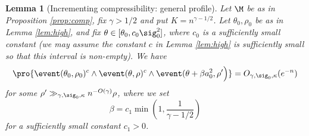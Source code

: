\documentclass[aop,preprint]{imsart}
\theoremstyle{plain}
\newtheorem{lemma}[theorem]{Lemma}
\theoremstyle{definition}
\theoremstyle{remark}
\numberwithin{equation}{section}
\numberwithin{theorem}{section}
\begin{document}
\begin{lemma}[Incrementing compressibility: general profile]	\label{lem:increment_gen}
Let $\M$ be as in Proposition \ref{prop:comp}, fix $\gamma>1/2$ and put $K=n^{\gamma-1/2}$. Let $\theta_0,\rho_0$ be as in Lemma \ref{lem:high}, and fix $\theta\in [\theta_0,c_0\sig_0^2]$, where $c_0$ is a sufficiently small constant (we may assume the constant $c$ in Lemma \ref{lem:high} is sufficiently small so that this interval is non-empty).
We have
\begin{equation}	\label{bound:increment_gen}
\pro{ \event(\theta_0,\rho_0)^c\wedge\event(\theta,\rho)^c \wedge \event( \theta+\beta a_0^2,\rho'\Big)} 
=O_{\gamma,\sig_0,\kappa}(e^{-n})
\end{equation}
for some $\rho' \gg_{\gamma,\sig_0,\kappa}  n^{-O(\gamma)}\rho$,
where we set
\begin{equation}	\label{set:beta}
\beta= c_1\min\left(1,\frac1{\gamma-1/2}\right)
\end{equation}
for a sufficiently small constant $c_1>0$.
\end{lemma}
\end{document}
